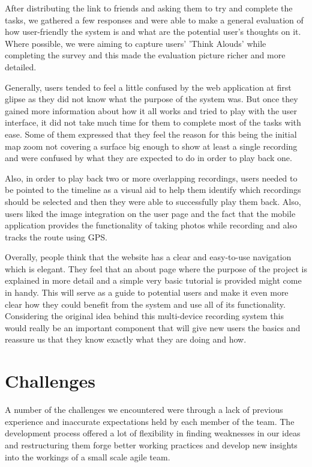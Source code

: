 \documentclass{l3proj}
\begin{document}
After distributing the link to friends and asking them to try and complete the tasks, we gathered a few responses and were able to make a general evaluation of how user-friendly the system is and what are the potential user's thoughts on it. Where possible, we were aiming to capture users' 'Think Alouds' while completing the survey and this made the evaluation picture richer and more detailed.

Generally, users tended to feel a little confused by the web application at first glipse as they did not know what the purpose of the system was. But once they gained more information about how it all works and tried to play with the user interface, it did not take much time for them to complete most of the tasks with ease. Some of them expressed that they feel the reason for this being the initial map zoom not covering a surface big enough to show at least a single recording and were confused by what they are expected to do in order to play back one.

Also, in order to play back two or more overlapping recordings, users needed to be pointed to the timeline as a visual aid to help them identify which recordings should be selected and then they were able to successfully play them back. Also, users liked the image integration on the user page and the fact that the mobile application provides the functionality of taking photos while recording and also tracks the route using GPS.

Overally, people think that the website has a clear and easy-to-use navigation which is elegant. They feel that an about page where the purpose of the project is explained in more detail and a simple very basic tutorial is provided might come in handy. This will serve as a guide to potential users and make it even more clear how they could benefit from the system and use all of its functionality. Considering the original idea behind this multi-device recording system this would really be an important component that will give new users the basics and reassure us that they know exactly what they are doing and how.

\chapter{Challenges}
\label{Challenges}

A number of the challenges we encountered were through a lack of previous
experience and inaccurate expectations held by each member of the team. The
development process offered a lot of flexibility in finding weaknesses in our
ideas and restructuring them forge better working practices and develop new
insights into the workings of a small scale agile team.
\end{document}
